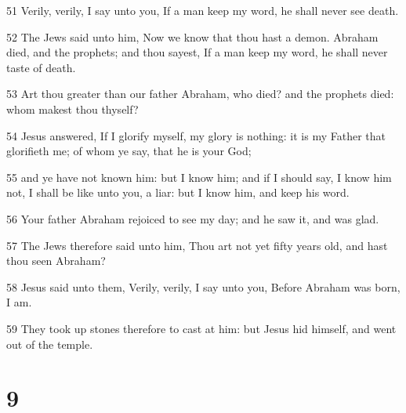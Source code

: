 \par 51 Verily, verily, I say unto you, If a man keep my word, he shall never see death.
\par 52 The Jews said unto him, Now we know that thou hast a demon. Abraham died, and the prophets; and thou sayest, If a man keep my word, he shall never taste of death.
\par 53 Art thou greater than our father Abraham, who died? and the prophets died: whom makest thou thyself?
\par 54 Jesus answered, If I glorify myself, my glory is nothing: it is my Father that glorifieth me; of whom ye say, that he is your God;
\par 55 and ye have not known him: but I know him; and if I should say, I know him not, I shall be like unto you, a liar: but I know him, and keep his word.
\par 56 Your father Abraham rejoiced to see my day; and he saw it, and was glad.
\par 57 The Jews therefore said unto him, Thou art not yet fifty years old, and hast thou seen Abraham?
\par 58 Jesus said unto them, Verily, verily, I say unto you, Before Abraham was born, I am.
\par 59 They took up stones therefore to cast at him: but Jesus hid himself, and went out of the temple.

\chapter{9}

